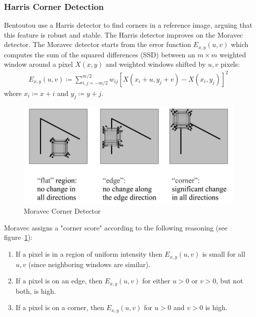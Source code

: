 \subsubsection{Harris Corner Detection}
Bentoutou \etal\cite{bentoutou2005automatic} use a Harris detector\cite{harris1988combined} to find corners in a reference image, arguing that this feature is robust and stable.
%
The Harris detector improves on the Moravec\cite{moravec1980obstacle} detector.
%
The Moravec detector starts from the error function $E_{x,y}(u,v)$ which computes the sum of the squared differences (SSD) between an $m \times m$ weighted window around a pixel $X(x, y)$ and weighted windows shifted by $u,v$ pixels:
\begin{equation}
    \begin{split}
        E_{x,y}(u,v) \coloneqq \sum_{i,j=-m/2}^{m/2} w_{ij}\left[ X(x_i+ u,y_j+v) - X(x_i, y_j)\right]^2
    \end{split}
    \label{moravecerrorfunction}
\end{equation}
where $x_i \coloneqq x + i$ and $y_j \coloneqq y+j$.
\begin{figure}
    \centering
    \includegraphics[width=\linewidth,keepaspectratio]{figures/corners.png}
    \caption{Moravec Corner Detector}
    \label{fig:corners}
\end{figure}
Moravec assigns a "corner score" according to the following reasoning (see figure~\ref{fig:corners}):
\begin{enumerate}
    \item If a pixel is in a region of uniform intensity then $E_{x,y}(u,v)$ is small for all $u,v$ (since neighboring windows are similar).
    \item If a pixel is on an edge, then $E_{x,y}(u,v)$ for either $u > 0$ or $v > 0$, but not both, is high.
    \item If a pixel is on a corner, then $E_{x,y}(u,v)$ for $u > 0$ and $v > 0$ is high.
\end{enumerate}
